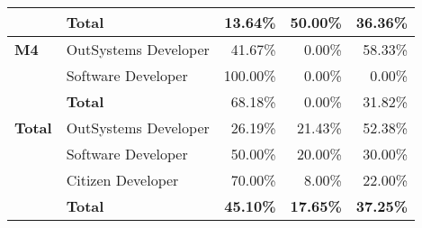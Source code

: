 \begin{table}[tb]
\begin{tabular}{@{}llrrr@{}}
                              & \textbf{Total}       & 13.64\%                                                           & 50.00\%                                                                 & 36.36\%                                                       \\ \midrule
    \textbf{M4}               & OutSystems Developer & 41.67\%                                                           & 0.00\%                                                                  & 58.33\%                                                       \\
                              & Software Developer   & 100.00\%                                                          & 0.00\%                                                                  & 0.00\%                                                        \\
                              & \textbf{Total}       & 68.18\%                                                           & 0.00\%                                                                  & 31.82\%                                                       \\ \midrule
    \rowcolor[HTML]{EFEFEF} 
    \textbf{Total}            & OutSystems Developer & 26.19\%                                                           & 21.43\%                                                                 & 52.38\%                                                       \\
    \rowcolor[HTML]{EFEFEF} 
                              & Software Developer   & 50.00\%                                                           & 20.00\%                                                                 & 30.00\%                                                       \\
    \rowcolor[HTML]{EFEFEF} 
                              & Citizen Developer    & 70.00\%                                                           & 8.00\%                                                                  & 22.00\%                                                       \\
    \rowcolor[HTML]{EFEFEF} 
                              & \textbf{Total}       & \textbf{45.10\%}                                                  & \textbf{17.65\%}                                                        & \textbf{37.25\%}                                              \\ \bottomrule
    \end{tabular}
    \end{table}


